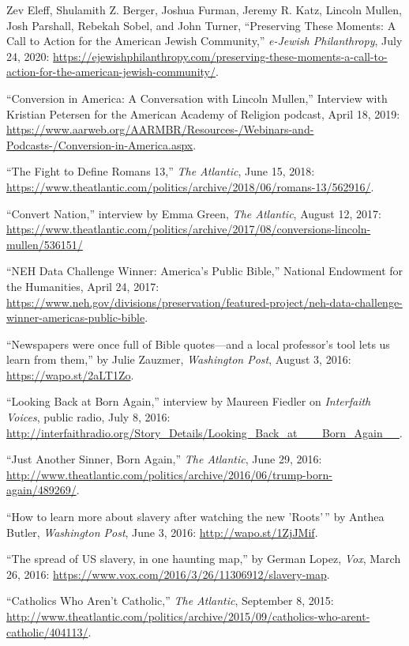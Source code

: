 \documentclass[11pt]{article}
\begin{document}
Zev Eleff, Shulamith Z. Berger, Joshua Furman, Jeremy R. Katz, Lincoln Mullen,
Josh Parshall, Rebekah Sobel, and John Turner, ``Preserving These Moments: A
Call to Action for the American Jewish Community,'' \emph{e-Jewish
Philanthropy}, July 24, 2020: \url{https://ejewishphilanthropy.com/preserving-these-moments-a-call-to-action-for-the-american-jewish-community/}.

``Conversion in America: A Conversation with Lincoln Mullen,'' Interview with
Kristian Petersen for the American Academy of Religion podcast, April 18, 2019: \url{https://www.aarweb.org/AARMBR/Resources-/Webinars-and-Podcasts-/Conversion-in-America.aspx}.

``The Fight to Define Romans 13,'' \emph{The Atlantic}, June 15, 2018: \url{https://www.theatlantic.com/politics/archive/2018/06/romans-13/562916/}.

``Convert Nation,'' interview by Emma Green, \emph{The Atlantic}, August 12, 
2017: \url{https://www.theatlantic.com/politics/archive/2017/08/conversions-lincoln-mullen/536151/}

``NEH Data Challenge Winner: America's Public Bible,'' National Endowment for 
the Humanities, April 24, 2017: 
\url{https://www.neh.gov/divisions/preservation/featured-project/neh-data-challenge-winner-americas-public-bible}.

``Newspapers were once full of Bible quotes---and a local professor's tool lets 
us learn from them,'' by Julie Zauzmer, \emph{Washington Post}, August 3, 2016: 
\url{https://wapo.st/2aLT1Zo}.

``Looking Back at Born Again,'' interview by Maureen Fiedler on \emph{Interfaith Voices}, public 
radio, July 8, 2016:  
\url{http://interfaithradio.org/Story_Details/Looking_Back_at___Born_Again__}.

``Just Another Sinner, Born Again,'' \emph{The Atlantic}, June 29, 2016: 
\url{http://www.theatlantic.com/politics/archive/2016/06/trump-born-again/489269/}.

``How to learn more about slavery after watching the new 'Roots'\,'' by Anthea Butler, \emph{Washington Post}, June 3, 2016: \url{http://wapo.st/1ZjJMif}.

``The spread of US slavery, in one haunting map,'' by German Lopez, 
\emph{Vox}, March 26, 2016: 
\url{https://www.vox.com/2016/3/26/11306912/slavery-map}.

``Catholics Who Aren't Catholic,'' \emph{The Atlantic}, September 8, 
2015:  
\url{http://www.theatlantic.com/politics/archive/2015/09/catholics-who-arent-catholic/404113/}.
\end{document}
